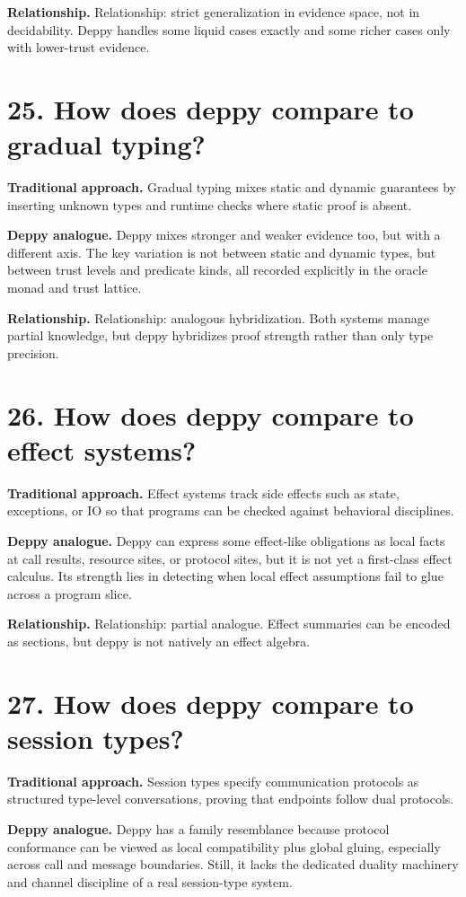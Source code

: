 \documentclass[11pt,openany]{book}
\begin{document}
\textbf{Relationship.} Relationship: strict generalization in evidence space, not in decidability. Deppy handles some liquid cases exactly and some richer cases only with lower-trust evidence.

\section*{25. How does deppy compare to gradual typing?}
\textbf{Traditional approach.} Gradual typing mixes static and dynamic guarantees by inserting unknown types and runtime checks where static proof is absent.

\textbf{Deppy analogue.} Deppy mixes stronger and weaker evidence too, but with a different axis. The key variation is not between static and dynamic types, but between trust levels and predicate kinds, all recorded explicitly in the oracle monad and trust lattice.

\textbf{Relationship.} Relationship: analogous hybridization. Both systems manage partial knowledge, but deppy hybridizes proof strength rather than only type precision.

\section*{26. How does deppy compare to effect systems?}
\textbf{Traditional approach.} Effect systems track side effects such as state, exceptions, or IO so that programs can be checked against behavioral disciplines.

\textbf{Deppy analogue.} Deppy can express some effect-like obligations as local facts at call results, resource sites, or protocol sites, but it is not yet a first-class effect calculus. Its strength lies in detecting when local effect assumptions fail to glue across a program slice.

\textbf{Relationship.} Relationship: partial analogue. Effect summaries can be encoded as sections, but deppy is not natively an effect algebra.

\section*{27. How does deppy compare to session types?}
\textbf{Traditional approach.} Session types specify communication protocols as structured type-level conversations, proving that endpoints follow dual protocols.

\textbf{Deppy analogue.} Deppy has a family resemblance because protocol conformance can be viewed as local compatibility plus global gluing, especially across call and message boundaries. Still, it lacks the dedicated duality machinery and channel discipline of a real session-type system.
\end{document}

